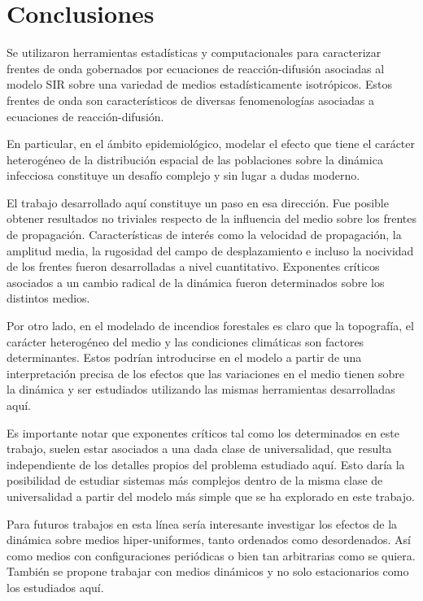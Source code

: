 \chapter{Conclusiones}
\graphicspath{{figs/}}
\label{Conclusiones}
\vspace*{-.1cm}

Se utilizaron herramientas estadísticas y computacionales para caracterizar frentes de onda gobernados por ecuaciones de reacción-difusión asociadas al modelo SIR sobre 
una variedad de medios estadísticamente isotrópicos. Estos frentes de onda son característicos de diversas fenomenologías asociadas a ecuaciones de reacción-difusión.

En particular, en el ámbito epidemiológico, modelar el efecto que tiene el carácter heterogéneo de la distribución espacial de las poblaciones sobre la dinámica 
infecciosa constituye un desafío complejo y sin lugar a dudas moderno.\cite{RILEY201568}

El trabajo desarrollado aquí constituye un paso en esa dirección. Fue posible 
obtener resultados no triviales respecto de la influencia del medio sobre los frentes de propagación. Características de interés como la velocidad de propagación, la 
amplitud media, la rugosidad del campo de desplazamiento e incluso la nocividad de los frentes fueron desarrolladas a nivel cuantitativo. Exponentes críticos asociados 
a un cambio radical de la dinámica fueron determinados sobre los distintos medios.

Por otro lado, en el modelado de incendios forestales es claro que la topografía, el carácter heterogéneo del medio y las condiciones climáticas son factores 
determinantes. Estos podrían introducirse en el modelo a partir de una interpretación precisa de los efectos que las variaciones en el medio tienen sobre la dinámica y 
ser estudiados utilizando las mismas herramientas desarrolladas aquí.

Es importante notar que exponentes críticos tal como los determinados en este trabajo, suelen estar asociados a una dada clase de universalidad, que resulta independiente 
de los detalles propios del problema estudiado aquí. \cite{barabasi1995fractal} Esto daría la posibilidad de estudiar sistemas más complejos dentro de la misma clase de universalidad a partir 
del modelo más simple que se ha explorado en este trabajo.

Para futuros trabajos en esta línea sería interesante investigar los efectos de la dinámica sobre medios hiper-uniformes, tanto ordenados como desordenados. Así como 
medios con configuraciones periódicas o bien tan arbitrarias como se quiera. También se propone trabajar con medios dinámicos y no solo estacionarios como los estudiados
aquí.
